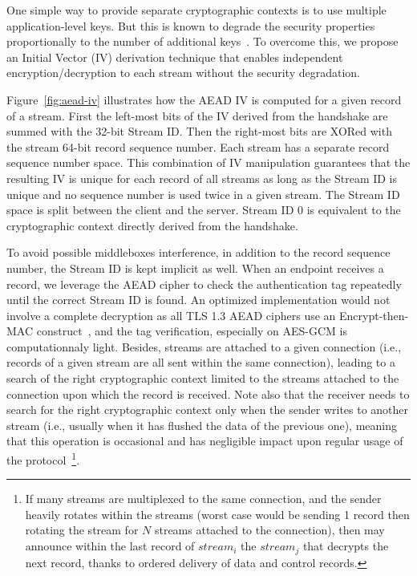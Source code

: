 One simple way to provide separate cryptographic contexts is to use multiple
application-level keys. But this is known to degrade the security properties
proportionally to the number of additional keys~\cite{chatterjee2011another}. To
overcome this, we propose an Initial Vector (IV) derivation technique that
enables independent encryption/decryption to each stream without the security
degradation.

Figure~\ref{fig:aead-iv} illustrates how the AEAD IV is computed for a given
\tcpls record of a \tcpls stream. First the left-most bits of the IV derived
from the \tls handshake are summed with the 32-bit \tcpls Stream ID. Then the
right-most bits are XORed with the stream 64-bit record sequence number. Each
\tcpls stream has a separate record sequence number space. This combination of
IV manipulation guarantees that the resulting IV is unique for each record of
all \tcpls streams as long as the Stream ID is unique and no sequence number is
used twice in a given stream. The Stream ID space is split between the client
and the server. Stream ID 0 is equivalent to the cryptographic context directly
derived from the handshake.

To avoid possible middleboxes interference, in addition to the record sequence
number, the \tcpls Stream ID is kept implicit as well. When an endpoint receives
a \tcpls record, we leverage the AEAD cipher to check the authentication tag
repeatedly until the correct \tcpls Stream ID is found. An optimized
implementation would not involve a complete decryption as all TLS 1.3 AEAD
ciphers use an Encrypt-then-MAC construct~\cite{rfc7366, rfc8446}, and the tag
verification, especially on AES-GCM is computationnaly light. Besides, streams
are attached to a given \tcp connection (i.e., records of a given stream are all
sent within the same \tcp connection), leading to a search of the right
cryptographic context limited to the streams attached to the connection upon
which the record is received. Note also that the receiver needs to search for
the right cryptographic context only when the sender writes to another stream (i.e.,
usually when it has flushed the data of the previous one), meaning that this
operation is occasional and has negligible impact upon regular usage of the
protocol~\footnote{If many streams are multiplexed to the same connection, and
  the sender heavily rotates within the streams (worst case would be sending 1
  record then rotating the stream for $N$ streams attached to the connection),
  then
  \tcpls may announce within the last record of $stream_i$ the 
  $stream_{j}$ that decrypts the next record, thanks to \tcp ordered delivery
of \tcpls data and control records.}.

